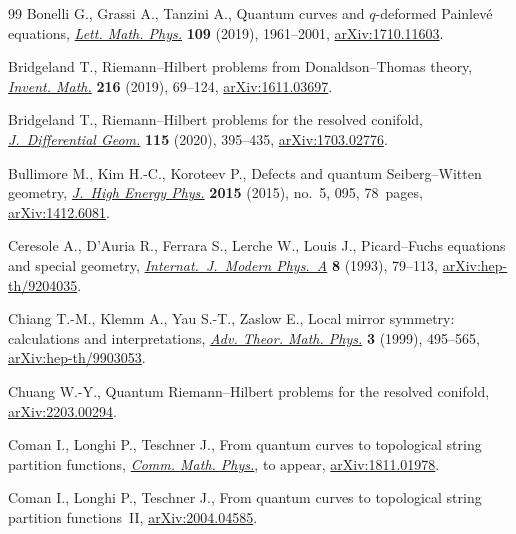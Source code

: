 \documentclass[pdftex]{sigma}
\numberwithin{equation}{section}
\begin{document}
\begin{thebibliography}{99}
Bonelli G., Grassi A., Tanzini A., Quantum curves and {$q$}-deformed
 {P}ainlev\'e equations, \href{https://doi.org/10.1007/s11005-019-01174-y}{\textit{Lett. Math. Phys.}} \textbf{109} (2019),
 1961--2001, \href{https://arxiv.org/abs/1710.11603}{arXiv:1710.11603}.

Bridgeland T., Riemann--{H}ilbert problems from {D}onaldson--{T}homas theory,
 \href{https://doi.org/10.1007/s00222-018-0843-8}{\textit{Invent. Math.}} \textbf{216} (2019), 69--124, \href{https://arxiv.org/abs/1611.03697}{arXiv:1611.03697}.

Bridgeland T., Riemann--{H}ilbert problems for the resolved conifold,
 \href{https://doi.org/10.4310/jdg/1594260015}{\textit{J.~Differential Geom.}} \textbf{115} (2020), 395--435,
 \href{https://arxiv.org/abs/1703.02776}{arXiv:1703.02776}.

Bullimore M., Kim H.-C., Koroteev P., Defects and quantum {S}eiberg--{W}itten
 geometry, \href{https://doi.org/10.1007/JHEP05(2015)095}{\textit{J.~High Energy Phys.}} \textbf{2015} (2015), no.~5, 095,
 78~pages, \href{https://arxiv.org/abs/1412.6081}{arXiv:1412.6081}.

Ceresole A., D'Auria R., Ferrara S., Lerche W., Louis J., Picard--{F}uchs
 equations and special geometry, \href{https://doi.org/10.1142/S0217751X93000047}{\textit{Internat.~J.~Modern Phys.~A}}
 \textbf{8} (1993), 79--113, \href{https://arxiv.org/abs/hep-th/9204035}{arXiv:hep-th/9204035}.

Chiang T.-M., Klemm A., Yau S.-T., Zaslow E., Local mirror symmetry: calculations
 and interpretations, \href{https://doi.org/10.4310/ATMP.1999.v3.n3.a3}{\textit{Adv. Theor. Math. Phys.}} \textbf{3} (1999),
 495--565, \href{https://arxiv.org/abs/hep-th/9903053}{arXiv:hep-th/9903053}.

Chuang W.-Y., Quantum {R}iemann--{H}ilbert problems for the resolved conifold,
 \href{https://arxiv.org/abs/2203.00294}{arXiv:2203.00294}.

Coman I., Longhi P., Teschner J., From quantum curves to topological string
 partition functions, \href{https://doi.org/10.1007/s00220-022-04579-4}{\textit{Comm. Math. Phys.}}, {t}o appear,
 \href{https://arxiv.org/abs/1811.01978}{arXiv:1811.01978}.

Coman I., Longhi P., Teschner J., From quantum curves to topological string
 partition functions~{II}, \href{https://arxiv.org/abs/2004.04585}{arXiv:2004.04585}.


\end{thebibliography}
\end{document}
